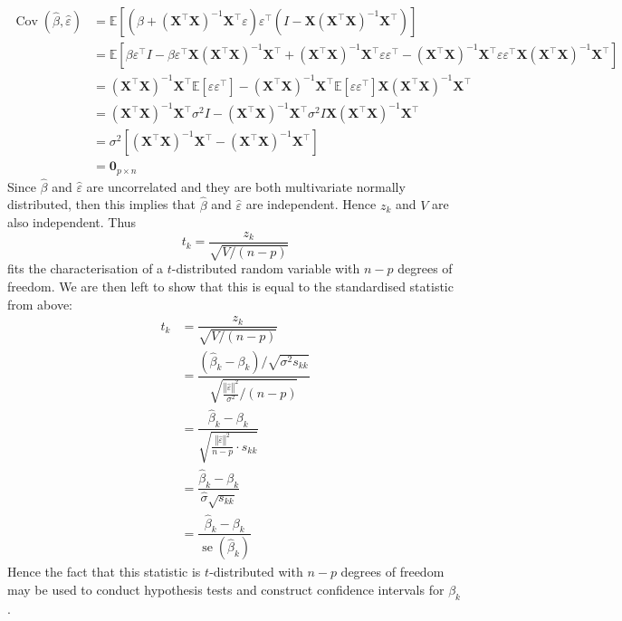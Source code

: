 \documentclass[11pt]{report} %
\begin{document}
\begin{align}
\operatorname{Cov}\left(\hat{\beta}, \hat{\varepsilon}\right) &= \mathbb{E}\left[\left(\beta+\left(\mathbf{X}^{\top}\mathbf{X}\right)^{-1}\mathbf{X}^{\top}\varepsilon\right)\varepsilon^{\top}\left(I-\mathbf{X}\left(\mathbf{X}^{\top}\mathbf{X}\right)^{-1}\mathbf{X}^{\top}\right)\right] \\
&= \mathbb{E}\left[\beta\varepsilon^{\top}I-\beta\varepsilon^{\top}\mathbf{X}\left(\mathbf{X}^{\top}\mathbf{X}\right)^{-1}\mathbf{X}^{\top}+\left(\mathbf{X}^{\top}\mathbf{X}\right)^{-1}\mathbf{X}^{\top}\varepsilon\varepsilon^{\top}-\left(\mathbf{X}^{\top}\mathbf{X}\right)^{-1}\mathbf{X}^{\top}\varepsilon\varepsilon^{\top}\mathbf{X}\left(\mathbf{X}^{\top}\mathbf{X}\right)^{-1}\mathbf{X}^{\top}\right] \\
&= \left(\mathbf{X}^{\top}\mathbf{X}\right)^{-1}\mathbf{X}^{\top}\mathbb{E}\left[\varepsilon\varepsilon^{\top}\right]-\left(\mathbf{X}^{\top}\mathbf{X}\right)^{-1}\mathbf{X}^{\top}\mathbb{E}\left[\varepsilon\varepsilon^{\top}\right]\mathbf{X}\left(\mathbf{X}^{\top}\mathbf{X}\right)^{-1}\mathbf{X}^{\top} \\
&= \left(\mathbf{X}^{\top}\mathbf{X}\right)^{-1}\mathbf{X}^{\top}\sigma^{2}I-\left(\mathbf{X}^{\top}\mathbf{X}\right)^{-1}\mathbf{X}^{\top}\sigma^{2}I\mathbf{X}\left(\mathbf{X}^{\top}\mathbf{X}\right)^{-1}\mathbf{X}^{\top} \\
&= \sigma^{2}\left[\left(\mathbf{X}^{\top}\mathbf{X}\right)^{-1}\mathbf{X}^{\top}-\left(\mathbf{X}^{\top}\mathbf{X}\right)^{-1}\mathbf{X}^{\top}\right] \\
&= \mathbf{0}_{p\times n}
\end{align}
Since $\hat{\beta}$ and $\hat{\varepsilon}$ are uncorrelated and they are both multivariate normally distributed, then this implies that $\hat{\beta}$ and $\hat{\varepsilon}$ are independent. Hence $z_{k}$ and $V$ are also independent. Thus
\begin{equation}
t_{k} = \dfrac{z_{k}}{\sqrt{V/\left(n - p\right)}}
\end{equation}
fits the characterisation of a $t$-distributed random variable with $n - p$ degrees of freedom. We are then left to show that this is equal to the standardised statistic from above:
\begin{align}
t_{k} &= \dfrac{z_{k}}{\sqrt{V/\left(n - p\right)}} \\
&= \dfrac{\left(\hat{\beta}_{k} - \beta_{k}\right)/\sqrt{\sigma^{2}s_{kk}}}{\sqrt{\frac{\left\Vert \hat{\varepsilon}\right\Vert^{2}}{\sigma^{2}}/\left(n - p\right)}} \\
&= \dfrac{\hat{\beta}_{k} - \beta_{k}}{\sqrt{\frac{\left\Vert \hat{\varepsilon}\right\Vert^{2}}{n - p}\cdot s_{kk}}} \\
&= \dfrac{\hat{\beta}_{k} - \beta_{k}}{\hat{\sigma}\sqrt{s_{kk}}} \\
&= \dfrac{\hat{\beta}_{k} - \beta_{k}}{\operatorname{se}\left(\hat{\beta}_{k}\right)}
\end{align}
Hence the fact that this statistic is $t$-distributed with $n - p$ degrees of freedom may be used to conduct hypothesis tests and construct confidence intervals for $\beta_{k}$.
\end{document}
